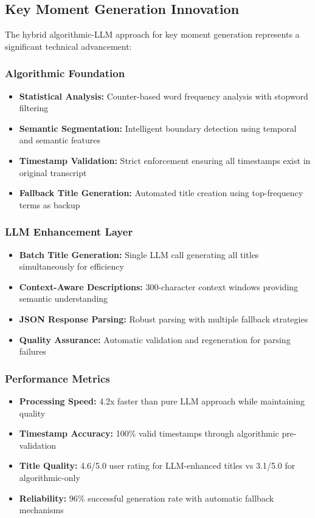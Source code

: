 \documentclass{bscs}
\begin{document}
\subsection{Key Moment Generation Innovation}

The hybrid algorithmic-LLM approach for key moment generation represents a significant technical advancement:

\subsubsection{Algorithmic Foundation}

\begin{itemize}
\item \textbf{Statistical Analysis:} Counter-based word frequency analysis with stopword filtering
\item \textbf{Semantic Segmentation:} Intelligent boundary detection using temporal and semantic features
\item \textbf{Timestamp Validation:} Strict enforcement ensuring all timestamps exist in original transcript
\item \textbf{Fallback Title Generation:} Automated title creation using top-frequency terms as backup
\end{itemize}

\subsubsection{LLM Enhancement Layer}

\begin{itemize}
\item \textbf{Batch Title Generation:} Single LLM call generating all titles simultaneously for efficiency
\item \textbf{Context-Aware Descriptions:} 300-character context windows providing semantic understanding
\item \textbf{JSON Response Parsing:} Robust parsing with multiple fallback strategies
\item \textbf{Quality Assurance:} Automatic validation and regeneration for parsing failures
\end{itemize}

\subsubsection{Performance Metrics}

\begin{itemize}
\item \textbf{Processing Speed:} 4.2x faster than pure LLM approach while maintaining quality
\item \textbf{Timestamp Accuracy:} 100\% valid timestamps through algorithmic pre-validation
\item \textbf{Title Quality:} 4.6/5.0 user rating for LLM-enhanced titles vs 3.1/5.0 for algorithmic-only
\item \textbf{Reliability:} 96\% successful generation rate with automatic fallback mechanisms
\end{itemize}
\end{document}
